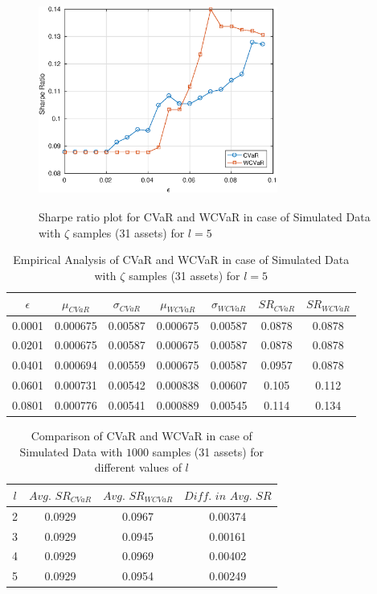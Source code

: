 \documentclass[12pt]{article}
\numberwithin{equation}{section}
\begin{document}
\begin{figure}[!h]
\centering
\includegraphics[height=7.0cm,width=0.7\textwidth]{CVaR/bse30_simulated/sr_exact_5.eps}
\caption{Sharpe ratio plot for CVaR and WCVaR in case of Simulated Data with $\zeta$ samples (31 assets) for $l=5$}
\label{fig:6.2}
\end{figure}
\begin{table}[!h]
\centering
\captionsetup{justification=centering}
\begin{tabular}{||c|c|c|c|c|c|c||}
\hline
$\epsilon$ & $\mu_{CVaR}$ & $\sigma_{CVaR}$ & $\mu_{WCVaR}$ & $\sigma_{WCVaR}$ & $SR_{CVaR}$ & $SR_{WCVaR}$\\
\hline
0.0001 & 0.000675 & 0.00587 & 0.000675 & 0.00587 & 0.0878 & 0.0878 \\
0.0201 & 0.000675 & 0.00587 & 0.000675 & 0.00587 & 0.0878 & 0.0878 \\
0.0401 & 0.000694 & 0.00559 & 0.000675 & 0.00587 & 0.0957 & 0.0878 \\
0.0601 & 0.000731 & 0.00542 & 0.000838 & 0.00607 & 0.105 & 0.112 \\
0.0801 & 0.000776 & 0.00541 & 0.000889 & 0.00545 & 0.114 & 0.134 \\
\hline
\end{tabular}
\caption{Empirical Analysis of CVaR and WCVaR in case of Simulated Data with $\zeta$ samples (31 assets) for $l=5$}
\label{tab:6.2}
\end{table}

\begin{table}[!h]
\centering
\captionsetup{justification=centering}
\begin{tabular}{||c|c|c|c||}
\hline
$l$ & $Avg. \, \, SR_{CVaR}$ & $Avg. \, \, SR_{WCVaR}$ & $Diff. \, \, in \, \, Avg. \, \, SR$ \\
\hline
2 & 0.0929 & 0.0967 & 0.00374 \\
3 & 0.0929 & 0.0945 & 0.00161 \\
4 & 0.0929 & 0.0969 & 0.00402 \\
5 & 0.0929 & 0.0954 & 0.00249 \\
\hline
\end{tabular}
\caption{Comparison of CVaR and WCVaR in case of Simulated Data with $1000$ samples (31 assets) for different values of $l$}
\label{avgtab:6.3}
\end{table}
\end{document}

